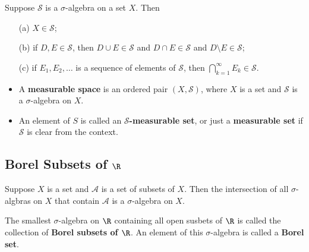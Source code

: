 \begin{prop}
    Suppose \( \mathcal{S} \) is a \( \sigma \)-algebra on a set \( X  \). Then
    \begin{enumerate}
        \item[(a)] \( X \in \mathcal{S} \);
        \item[(b)] if \( D,E \in \mathcal{S} \), then \( D \cup E \in \mathcal{S} \) and \( D \cap E \in \mathcal{S} \) and \( D \setminus  E \in \mathcal{S} \);
        \item[(c)] if \( {E}_{1}, {E}_{2}, \dots  \) is a sequence of elements of \( \mathcal{S} \), then \( \bigcap_{  k = 1  }^{ \infty  }  {E}_{k} \in \mathcal{S} \).
    \end{enumerate}
\end{prop}

\begin{definition}
    \begin{itemize}
        \item A \textbf{measurable space} is an ordered pair \( (X,\mathcal{S}) \), where \( X  \) is a set and \( \mathcal{S} \) is a \( \sigma \)-algebra on \( X  \).
        \item An element of \( S  \) is called an \textbf{\( \mathcal{S} \)-measurable set}, or just a \textbf{measurable set} if \( \mathcal{S} \) is clear from the context.
    \end{itemize}
\end{definition}

\subsection{Borel Subsets of \( \R  \)}

\begin{prop}
    Suppose \( X  \) is a set and \( \mathcal{A} \) is a set of subsets of \( X  \). Then the intersection of all \( \sigma \)-algbras on \( X  \) that contain \( \mathcal{A} \) is a \( \sigma \)-algebra on \( X  \).
\end{prop}

\begin{definition}
    The smallest \( \sigma \)-algebra on \( \R  \) containing all open susbets of \( \R  \) is called the collection of \textbf{Borel subsets of \( \R  \)}. An element of this \( \sigma \)-algebra is called a \textbf{Borel set}.
\end{definition}

